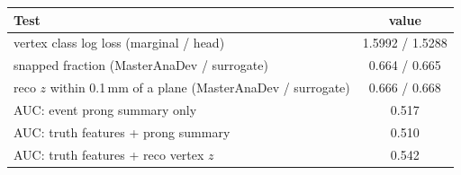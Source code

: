 \begin{tabular}{lc}
\toprule
Test & value \\
\midrule
vertex class log loss (marginal / head) & 1.5992 / 1.5288 \\
snapped fraction (MasterAnaDev / surrogate) & 0.664 / 0.665 \\
reco $z$ within 0.1\,mm of a plane (MasterAnaDev / surrogate) & 0.666 / 0.668 \\
\midrule
AUC: event prong summary only & 0.517 \\
AUC: truth features + prong summary & 0.510 \\
AUC: truth features + reco vertex $z$ & 0.542 \\
\bottomrule
\end{tabular}
